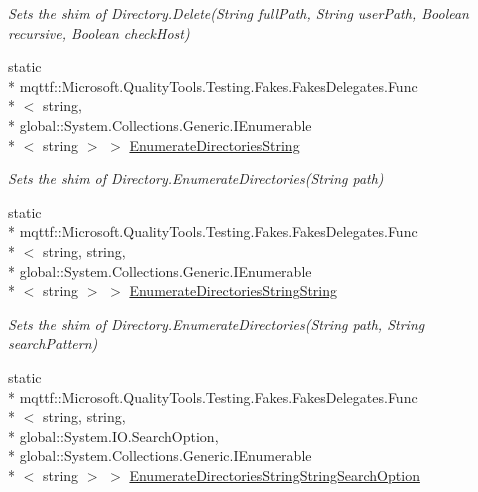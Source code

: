 \begin{DoxyCompactItemize}
\begin{DoxyCompactList}\small\item\em Sets the shim of Directory.\-Delete(\-String full\-Path, String user\-Path, Boolean recursive, Boolean check\-Host)\end{DoxyCompactList}\item 
static \\*
mqttf\-::\-Microsoft.\-Quality\-Tools.\-Testing.\-Fakes.\-Fakes\-Delegates.\-Func\\*
$<$ string, \\*
global\-::\-System.\-Collections.\-Generic.\-I\-Enumerable\\*
$<$ string $>$ $>$ \hyperlink{class_system_1_1_i_o_1_1_fakes_1_1_shim_directory_a7c3f17a9b46c6d5ee6657568e6cea8e4}{Enumerate\-Directories\-String}
\begin{DoxyCompactList}\small\item\em Sets the shim of Directory.\-Enumerate\-Directories(\-String path)\end{DoxyCompactList}\item 
static \\*
mqttf\-::\-Microsoft.\-Quality\-Tools.\-Testing.\-Fakes.\-Fakes\-Delegates.\-Func\\*
$<$ string, string, \\*
global\-::\-System.\-Collections.\-Generic.\-I\-Enumerable\\*
$<$ string $>$ $>$ \hyperlink{class_system_1_1_i_o_1_1_fakes_1_1_shim_directory_a7c447cfb39617189122f645ad8d175ce}{Enumerate\-Directories\-String\-String}
\begin{DoxyCompactList}\small\item\em Sets the shim of Directory.\-Enumerate\-Directories(\-String path, String search\-Pattern)\end{DoxyCompactList}\item 
static \\*
mqttf\-::\-Microsoft.\-Quality\-Tools.\-Testing.\-Fakes.\-Fakes\-Delegates.\-Func\\*
$<$ string, string, \\*
global\-::\-System.\-I\-O.\-Search\-Option, \\*
global\-::\-System.\-Collections.\-Generic.\-I\-Enumerable\\*
$<$ string $>$ $>$ \hyperlink{class_system_1_1_i_o_1_1_fakes_1_1_shim_directory_a72a18f13f116637161293f9d8dad4961}{Enumerate\-Directories\-String\-String\-Search\-Option}

\end{DoxyCompactItemize}
